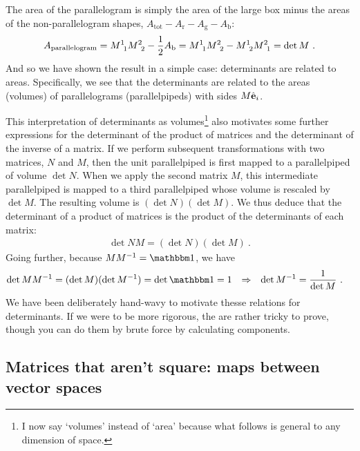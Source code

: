 \documentclass[12pt]{article}
\begin{document}
% 
The area of the parallelogram is simply the area of the large box minus the areas of the non-parallelogram shapes, $A_\text{tot}- A_\text{r} - A_\text{g} - A_\text{b}$:
\begin{align}
    A_\text{parallelogram} =  M\aij 11 M\aij 22 - \frac 12 A_\text{b}  = M\aij 11 M\aij 22  - M\aij 12 M\aij 21  = \det M \ .
    \label{eq:det:is:area:parallelogram}
\end{align}
And so we have shown the result in a simple case: determinants are related to areas. Specifically, we see that the determinants are related to the areas (volumes) of parallelograms (parallelpipeds) with sides $M\hat{\mathbf{e}}_i$. 

This interpretation of determinants as volumes\footnote{I now say `volumes' instead of `area' because what follows is general to any dimension of space.} also motivates some further expressions for the determinant of the product of matrices and the determinant of the inverse of a matrix. If we perform subsequent transformations with two matrices, $N$ and $M$, then the unit parallelpiped is first mapped to a parallelpiped of volume $\det N$. When we apply the second matrix $M$, this intermediate parallelpiped is mapped to a third parallelpiped whose volume is rescaled by $\det M$. The resulting volume is $(\det N)(\det M)$. We thus deduce that the determinant of a product of matrices is the product of the determinants of each matrix:
\begin{align}
    \det NM = (\det N)(\det M) \ . 
    \label{eq:det:of:product}
\end{align}
Going further, because $M M\inv = \one$, we have
\begin{align}
    \det M M\inv &= (\det M)(\det M\inv ) = \det\one = 1 
    & \Rightarrow&
    &
     \det M\inv &= \frac{1}{\det M} \ .
    \label{eq:det:of:inverse}
\end{align}
We have been deliberately hand-wavy to motivate thesse relations for determinants. If we were to be more rigorous, the are rather tricky to prove, though you can do them by brute force by calculating components. 



\subsection{Matrices that aren't square: maps between vector spaces}
\end{document}
